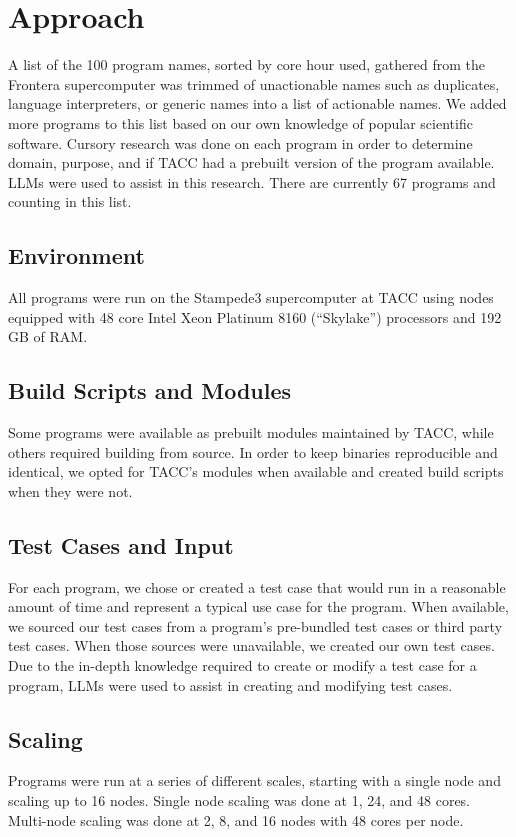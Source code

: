 \documentclass[conference]{IEEEtran}
\begin{document}
\section{Approach}
A list of the 100 program names, sorted by core hour used, gathered from the Frontera supercomputer was trimmed of unactionable names such as duplicates, language interpreters, or generic names into a list of actionable names. We added more programs to this list based on our own knowledge of popular scientific software. Cursory research was done on each program in order to determine domain, purpose, and if TACC had a prebuilt version of the program available. LLMs were used to assist in this research. There are currently 67 programs and counting in this list.

\subsection{Environment}
All programs were run on the Stampede3 supercomputer at TACC using nodes equipped with 48 core Intel Xeon Platinum 8160 (``Skylake'') processors and 192 GB of RAM.

\subsection{Build Scripts and Modules}
Some programs were available as prebuilt modules maintained by TACC, while others required building from source. In order to keep binaries reproducible and identical, we opted for TACC's modules when available and created build scripts when they were not.

\subsection{Test Cases and Input}
For each program, we chose or created a test case that would run in a reasonable amount of time and represent a typical use case for the program. When available, we sourced our test cases from a program's pre-bundled test cases or third party test cases. When those sources were unavailable, we created our own test cases. Due to the in-depth knowledge required to create or modify a test case for a program, LLMs were used to assist in creating and modifying test cases.

\subsection{Scaling}
Programs were run at a series of different scales, starting with a single node and scaling up to 16 nodes. Single node scaling was done at 1, 24, and 48 cores. Multi-node scaling was done at 2, 8, and 16 nodes with 48 cores per node.
\end{document}
